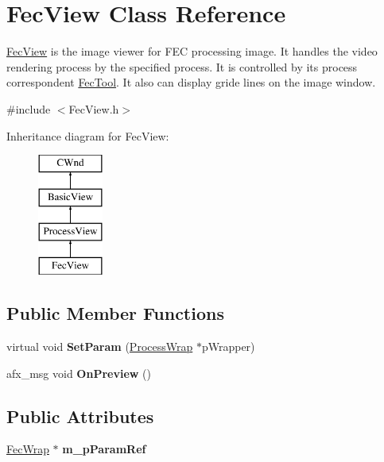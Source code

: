 \hypertarget{class_fec_view}{}\section{Fec\+View Class Reference}
\label{class_fec_view}


\mbox{\hyperlink{class_fec_view}{Fec\+View}} is the image viewer for F\+EC processing image. It handles the video rendering process by the specified process. It is controlled by its process correspondent \mbox{\hyperlink{class_fec_tool}{Fec\+Tool}}. It also can display gride lines on the image window.  




{\ttfamily \#include $<$Fec\+View.\+h$>$}

Inheritance diagram for Fec\+View\+:\begin{figure}[H]
\begin{center}
\leavevmode
\includegraphics[height=4.000000cm]{class_fec_view}
\end{center}
\end{figure}
\subsection*{Public Member Functions}
\begin{DoxyCompactItemize}
\item 
\mbox{\label{class_fec_view_a8d9efd2c95cbd8807518735d46ae4eee}} 
virtual void {\bfseries Set\+Param} (\mbox{\hyperlink{class_process_wrap}{Process\+Wrap}} $\ast$p\+Wrapper)
\item 
\mbox{\label{class_fec_view_a83ed54e633d3b45d4134dcf0d8f8941e}} 
afx\+\_\+msg void {\bfseries On\+Preview} ()
\end{DoxyCompactItemize}
\subsection*{Public Attributes}
\begin{DoxyCompactItemize}
\item 
\mbox{\label{class_fec_view_afafd7be607439614e4627e085e203f04}} 
\mbox{\hyperlink{class_fec_wrap}{Fec\+Wrap}} $\ast$ {\bfseries m\+\_\+p\+Param\+Ref}
\end{DoxyCompactItemize}
